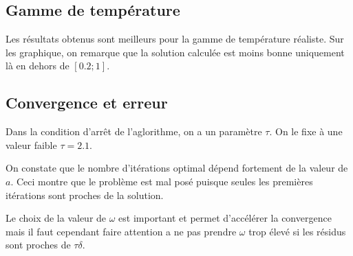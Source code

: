 \documentclass[a4paper,10pt]{article}
\begin{document}
\subsection{Gamme de température}

Les résultats obtenus sont meilleurs pour la gamme de température réaliste. Sur les graphique, on remarque que la solution calculée est moins bonne uniquement là en dehors de $[0.2;1]$.

\subsection{Convergence et erreur}

Dans la condition d'arr\^et de l'aglorithme, on a un paramètre $\tau$. On le fixe à une valeur faible $\tau = 2.1$.

On constate que le nombre d'itérations optimal dépend fortement de la valeur de $a$. Ceci montre que le problème est mal posé puisque seules les premières itérations sont proches de la solution.

Le choix de la valeur de $\omega$ est important et permet d'accélérer la convergence mais il faut cependant faire attention a ne pas prendre $\omega$ trop élevé si les résidus sont proches de $\tau \delta$.


\clearpage
\end{document}
